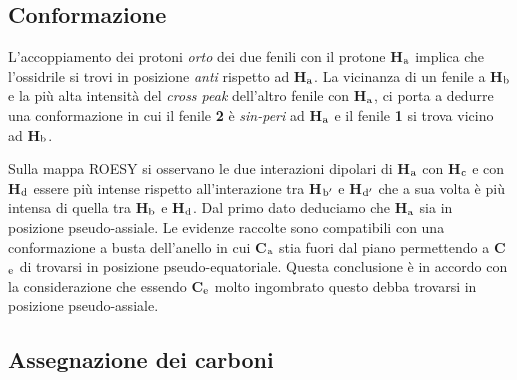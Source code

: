 \documentclass[a4paper, italian, oneside, 12pt]{article}
\begin{document}
\subsection{Conformazione}

L'accoppiamento dei protoni \emph{orto} dei due fenili con il protone {\bf{H$_{\textrm a}$}} implica che l'ossidrile si trovi in posizione {\emph{anti}} rispetto ad {\bf{H$_{\textrm a}$}}. La vicinanza di un fenile a {\bf{H$_{\textrm b}$}} e la più alta intensità del {\emph{cross peak}} dell'altro fenile con {\bf{H$_{\textrm a}$}}, ci porta a dedurre una conformazione in cui il fenile {\bf{2}} è {\emph{sin-peri}} ad {\bf{H$_{\textrm a}$}} e il fenile {\bf{1}} si trova vicino ad {\bf{H$_{\textrm b}$}}. 

Sulla mappa ROESY si osservano le due interazioni dipolari di {\bf{H$_{\textrm a}$}} con {\bf{H$_{\textrm c}$}} e con {\bf{H$_{\textrm d}$}} essere più intense rispetto all'interazione tra {\bf{H$_{\textrm b'}$}} e {\bf{H$_{\textrm d'}$}} che a sua volta è più intensa di quella tra {\bf{H$_{\textrm b}$}} e {\bf{H$_{\textrm d}$}}. Dal primo dato deduciamo che {\bf{H$_{\textrm a}$}} sia in posizione pseudo-assiale. Le evidenze raccolte sono compatibili con una conformazione a busta dell'anello in cui {\bf{C$_{\textrm a}$}} stia fuori dal piano permettendo a {\bf{C$_{\textrm e}$}} di trovarsi in posizione pseudo-equatoriale. Questa conclusione è in accordo con la considerazione che essendo {\bf{C$_{\textrm e}$}} molto ingombrato questo debba trovarsi in posizione pseudo-assiale.


\subsection{Assegnazione dei carboni}
\end{document}
